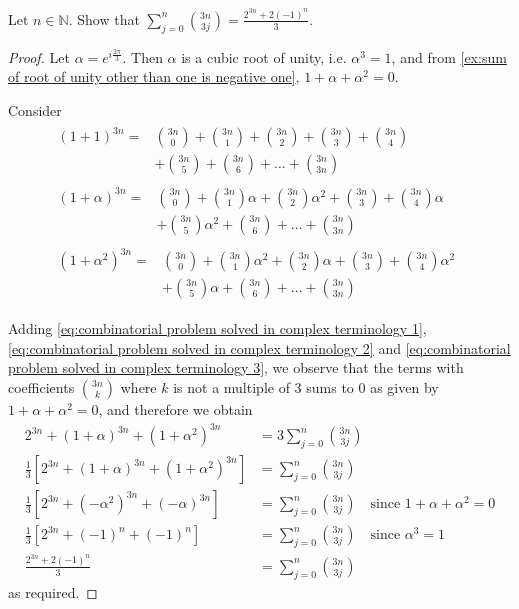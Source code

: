 \documentclass[11pt, oneside]{book}
\begin{document}
\begin{ex}
	Let $n \in \mathbb{N}$. Show that $\sum_{j=0}^{n} \binom{3n}{3j} = \frac{2^{3n} + 2(-1)^n}{3}$.

	\begin{proof}
		Let $\alpha = e^{i \frac{2\pi}{3}}$. Then $\alpha$ is a cubic root of unity, i.e. $\alpha^3 = 1$, and from \cref{ex:sum of root of unity other than one is negative one}, $1 + \alpha + \alpha^2 = 0$.

		Consider
		\begin{align}
			\begin{split}\label{eq:combinatorial problem solved in complex terminology 1}
			(1 + 1)^{3n}
				=& \binom{3n}{0} + \binom{3n}{1} + \binom{3n}{2} + \binom{3n}{3} + \binom{3n}{4} \\
				&+ \binom{3n}{5} + \binom{3n}{6} + \hdots + \binom{3n}{3n}
			\end{split} \\
			\begin{split}\label{eq:combinatorial problem solved in complex terminology 2}
			(1 + \alpha)^{3n}
				=& \binom{3n}{0} + \binom{3n}{1}\alpha + \binom{3n}{2}\alpha^2 + \binom{3n}{3} + \binom{3n}{4}\alpha \\
				&+ \binom{3n}{5}\alpha^2 + \binom{3n}{6} + \hdots + \binom{3n}{3n}
			\end{split} \\
			\begin{split}\label{eq:combinatorial problem solved in complex terminology 3}
			(1 + \alpha^2)^{3n}
				=&\binom{3n}{0} + \binom{3n}{1}\alpha^2 + \binom{3n}{2}\alpha + \binom{3n}{3} + \binom{3n}{4}\alpha^2 \\
				&+ \binom{3n}{5}\alpha + \binom{3n}{6} + \hdots + \binom{3n}{3n}
			\end{split}
			\phantom{a}
		\end{align}

		Adding \cref{eq:combinatorial problem solved in complex terminology 1}, \cref{eq:combinatorial problem solved in complex terminology 2} and \cref{eq:combinatorial problem solved in complex terminology 3}, we observe that the terms with coefficients $\binom{3n}{k}$ where $k$ is not a multiple of 3 sums to 0 as given by $1 + \alpha + \alpha^2 = 0$, and therefore we obtain
		\begin{align*}
			2^{3n} + (1 + \alpha)^{3n} + (1 + \alpha^2)^{3n} &= 3 \sum_{j=0}^{n} \binom{3n}{3j} \\
			\frac{1}{3} \left[2^{3n} + (1 + \alpha)^{3n} + (1 + \alpha^2)^{3n}\right] &= \sum_{j=0}^{n} \binom{3n}{3j} \\
			\frac{1}{3} \left[2^{3n} + (-\alpha^2)^{3n} + (-\alpha)^{3n} \right] &= \sum_{j=0}^{n} \binom{3n}{3j} \quad \text{since } 1 + \alpha + \alpha^2 = 0 \\
			\frac{1}{3} \left[2^{3n} + (-1)^n + (-1)^n \right] &= \sum_{j=0}^{n} \binom{3n}{3j} \quad \text{since } \alpha^3 = 1 \\
			\frac{2^{3n} + 2(-1)^n}{3} &= \sum_{j=0}^{n} \binom{3n}{3j}
		\end{align*}
		as required.
	\end{proof}
\end{ex}
\end{document}
